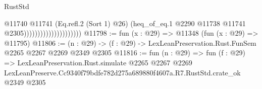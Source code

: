 \begin{lexlean}{RustStd}
\begin{coremodule}
                                          @11740
                                            @11741
                                            (Eq.refl.{2} (Sort 1) @26)
                                            (heq_of_eq.{1}
                                              @2290
                                              @11738
                                              @11741
                                              @2305)))))))))))))))))))))
@11798 := fun (x : @29) => @11348 (fun (x : @29) => @11795)
@11806 := (n : @29) -> (f : @29) -> LexLeanPreservation.Rust.FunSem @2265 @2267 @2269 @2349 @2305
@11816 := fun (n : @29) =>
  fun (f : @29) =>
  LexLeanPreservation.Rust.simulate
    @2265
    @2267
    @2269
    LexLeanPreserve.Cc9340f79bdfe782d275a689880f4607a.R7.RustStd.crate_ok
    @2349
    @2305
\end{coremodule}
\end{lexlean}
